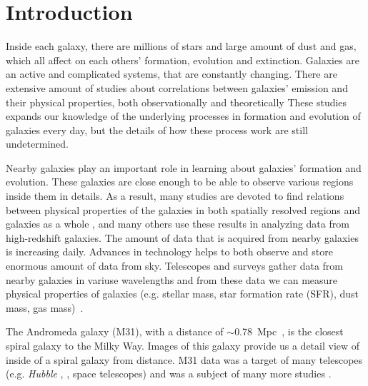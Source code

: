 \section{Introduction} %
Inside each galaxy, there are millions of stars and large amount of dust and gas, which all affect on each others' formation, evolution and extinction.
Galaxies are an active and complicated systems, that are constantly changing.
There are extensive amount of studies about correlations between galaxies' emission and their physical properties, both observationally and theoretically %
These studies expands our knowledge of the underlying processes in formation and evolution of galaxies every day, but the details of how these process work are still undetermined.

Nearby galaxies play an important role in learning about galaxies' formation and evolution.
These galaxies are close enough to be able to observe various regions inside them in details.
As a result, many studies are devoted to find relations between physical properties of the galaxies in both spatially resolved regions and galaxies as a whole%
, and many others use these results in analyzing data from high-redshift galaxies. %
The amount of data that is acquired from nearby galaxies is increasing daily.
Advances in technology helps to both observe and store enormous amount of data from sky.%
Telescopes and surveys gather data from nearby galaxies in variuse wavelengths and from these data we can measure physical properties of galaxies (e.g. stellar mass, star formation rate (SFR), dust mass, gas mass)~\citep[e.g.][]{Calzetti07,Dale09,Eskew12}.

The Andromeda galaxy (M31), with a distance of $\sim$0.78~Mpc~\citep{McConnachie05}, is the closest spiral galaxy to the Milky Way.
Images of this galaxy provide us a detail view of inside of a spiral galaxy from distance.
M31 data was a target of many telescopes (e.g. {\it Hubble} \citep{Dalcanton12}, \Spitzer\citep{Wener04}, \Herschel\citep{Pilbratt10} space telescopes) and was a subject of many more studies \citep[e.g.][and references therein]{Barmby06, Gordon06, Azimlu11, Sanders12, Dim15, Rahmani16}. 

